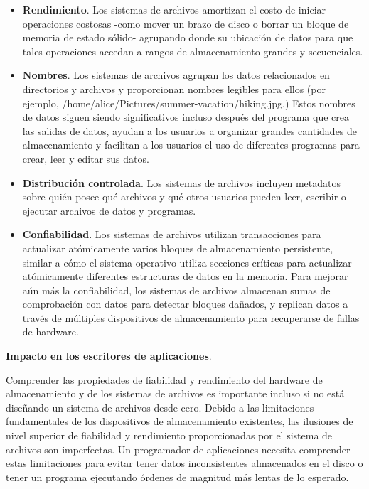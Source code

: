 \documentclass[10pt]{book}
\begin{document}
\begin{itemize}
\item \textbf{Rendimiento}. Los sistemas de archivos amortizan el costo de iniciar operaciones costosas -como mover un brazo de disco o borrar un bloque de memoria de estado sólido- agrupando donde su ubicación de datos para que tales operaciones accedan a rangos de almacenamiento grandes y secuenciales.

\item \textbf{Nombres}. Los sistemas de archivos agrupan los datos relacionados en directorios y archivos y proporcionan nombres legibles para ellos (por ejemplo, /home/alice/Pictures/summer-vacation/hiking.jpg.) Estos nombres de datos siguen siendo significativos incluso después del programa que crea las salidas de datos, ayudan a los usuarios a organizar grandes cantidades de almacenamiento y facilitan a los usuarios el uso de diferentes programas para crear, leer y editar sus datos.

\item \textbf{Distribución controlada}. Los sistemas de archivos incluyen metadatos sobre quién posee qué archivos y qué otros usuarios pueden leer, escribir o ejecutar archivos de datos y programas.

\item \textbf{Confiabilidad}. Los sistemas de archivos utilizan transacciones para actualizar atómicamente varios bloques de almacenamiento persistente, similar a cómo el sistema operativo utiliza secciones críticas para actualizar atómicamente diferentes estructuras de datos en la memoria. Para mejorar aún más la confiabilidad, los sistemas de archivos almacenan sumas de comprobación con datos para detectar bloques dañados, y replican datos a través de múltiples dispositivos de almacenamiento para recuperarse de fallas de hardware.
\end{itemize}

\textbf{Impacto en los escritores de aplicaciones}.

Comprender las propiedades de fiabilidad y rendimiento del hardware de almacenamiento y de los sistemas de archivos es importante incluso si no está diseñando un sistema de archivos desde cero. Debido a las limitaciones fundamentales de los dispositivos de almacenamiento existentes, las ilusiones de nivel superior de fiabilidad y rendimiento proporcionadas por el sistema de archivos son imperfectas. Un programador de aplicaciones necesita comprender estas limitaciones para evitar tener datos inconsistentes almacenados en el disco o tener un programa ejecutando órdenes de magnitud más lentas de lo esperado.
\end{document}
